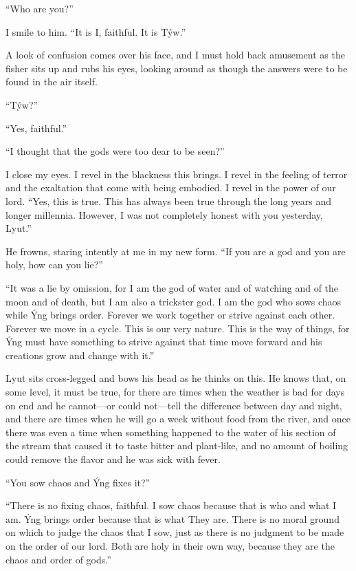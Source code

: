 ``Who are you?''

I smile to him. ``It is I, faithful. It is Týw.''

A look of confusion comes over his face, and I must hold back amusement as the fisher sits up and rubs his eyes, looking around as though the answers were to be found in the air itself.

``Týw?''

``Yes, faithful.''

``I thought that the gods were too dear to be seen?''

I close my eyes. I revel in the blackness this brings. I revel in the feeling of terror and the exaltation that come with being embodied. I revel in the power of our lord. ``Yes, this is true. This has always been true through the long years and longer millennia. However, I was not completely honest with you yesterday, Lyut.''

He frowns, staring intently at me in my new form. ``If you are a god and you are holy, how can you lie?''

``It was a lie by omission, for I am the god of water and of watching and of the moon and of death, but I am also a trickster god. I am the god who sows chaos while Ýng brings order. Forever we work together or strive against each other. Forever we move in a cycle. This is our very nature. This is the way of things, for Ýng must have something to strive against that time move forward and his creations grow and change with it.''

Lyut sits cross-legged and bows his head as he thinks on this. He knows that, on some level, it must be true, for there are times when the weather is bad for days on end and he cannot---or could not---tell the difference between day and night, and there are times when he will go a week without food from the river, and once there was even a time when something happened to the water of his section of the stream that caused it to taste bitter and plant-like, and no amount of boiling could remove the flavor and he was sick with fever.

``You sow chaos and Ýng fixes it?''

``There is no fixing chaos, faithful. I sow chaos because that is who and what I am. Ýng brings order because that is what They are. There is no moral ground on which to judge the chaos that I sow, just as there is no judgment to be made on the order of our lord. Both are holy in their own way, because they are the chaos and order of gods.''

